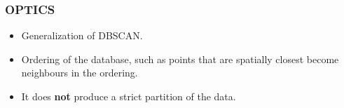 \documentclass[hyperref={pdfpagelabels=true}]{beamer}
\begin{document}



\begin{frame}
\frametitle{OPTICS}
\begin{itemize}%
      \item<1->Generalization of DBSCAN.%
      \item<1->Ordering of the database, such as points that are spatially closest become neighbours in the ordering.
      \item<1->It does \textbf{not} produce a strict partition of the data.%
\end{itemize}                
\end{frame}
\end{document}

